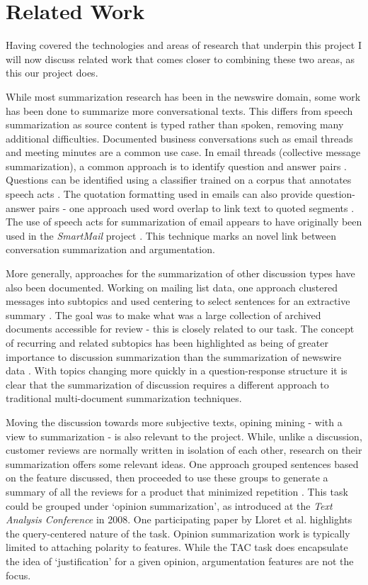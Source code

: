   \section{Related Work}
    Having covered the technologies and areas of research that underpin this project I will now discuss related work that comes closer to combining these two areas, as this our project does.

    While most summarization research has been in the newswire domain, some work has been done to summarize more conversational texts. This differs from speech summarization as source content is typed rather than spoken, removing many additional difficulties. Documented business conversations such as email threads and meeting minutes are a common use case. In email threads (collective message summarization), a common approach is to identify question and answer pairs \cite{shrestha2007using,shrestha2004detection,carenini2007summarizing}. Questions can be identified using a classifier trained on a corpus that annotates speech acts \cite{shrestha2004detection}. The quotation formatting used in emails can also provide question-answer pairs - one approach used word overlap to link text to quoted segments \cite{carenini2007summarizing}. The use of speech acts for summarization of email appears to have originally been used in the \textit{SmartMail} project \cite{corston2004task}. This technique marks an novel link between conversation summarization and argumentation.

    More generally, approaches for the summarization of other discussion types have also been documented. Working on mailing list data, one approach clustered messages into subtopics and used centering to select sentences for an extractive summary \cite{newman2003summarizing}. The goal was to make what was a large collection of archived documents accessible for review - this is closely related to our task. The concept of recurring and related subtopics has been highlighted as being of greater importance to discussion summarization than the summarization of newswire data \cite{zhou2006summarization}. With topics changing more quickly in a question-response structure it is clear that the summarization of discussion requires a different approach to traditional multi-document summarization techniques.

    Moving the discussion towards more subjective texts, opining mining - with a view to summarization - is also relevant to the project. While, unlike a discussion, customer reviews are normally written in isolation of each other, research on their summarization offers some relevant ideas. One approach grouped sentences based on the feature discussed, then proceeded to use these groups to generate a summary of all the reviews for a product that minimized repetition \cite{hu2004mining}. This task could be grouped under `opinion summarization', as introduced at the \textit{Text Analysis Conference} in 2008. One participating paper by Lloret et al. \cite{lloret2009towards} highlights the query-centered nature of the task. Opinion summarization work is typically limited to attaching polarity to features. While the TAC task does encapsulate the idea of `justification' for a given opinion, argumentation features are not the focus.


